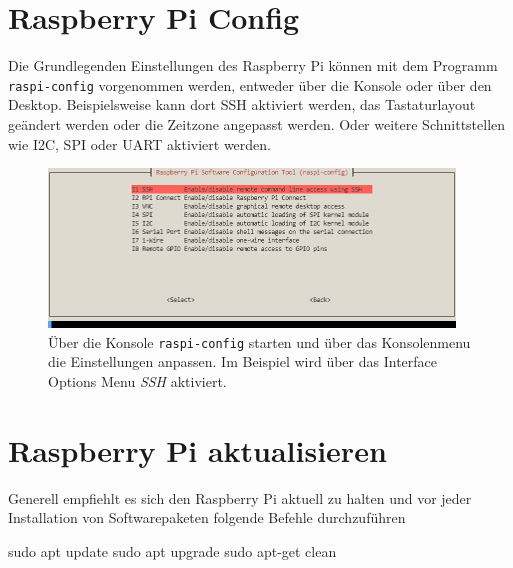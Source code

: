 \documentclass[
  11pt,
  a4paperpaper,
  oneside, openany  ,captions=tableheading
]{scrbook}
\newenvironment{Shaded}{\begin{snugshade}}{\end{snugshade}}
\newcommand{\FunctionTok}[1]{\textcolor[rgb]{0.28,0.35,0.67}{#1}}
\newcommand{\NormalTok}[1]{\textcolor[rgb]{0.00,0.23,0.31}{#1}}
\theoremstyle{definition}
\theoremstyle{remark}
\begin{document}
\section{Raspberry Pi Config}\label{raspberry-pi-config}

Die Grundlegenden Einstellungen des Raspberry Pi können mit dem Programm
\texttt{raspi-config} vorgenommen werden, entweder
über die Konsole oder über den Desktop. Beispielsweise kann dort SSH
aktiviert werden, das Tastaturlayout geändert werden oder die Zeitzone
angepasst werden. Oder weitere Schnittstellen wie I2C, SPI oder UART
aktiviert werden.

\begin{figure}[H]

{\centering \includegraphics{images/raspberry_pi_enable_ssh.png}

}

\caption{Über die Konsole \texttt{raspi-config} starten und über das
Konsolenmenu die Einstellungen anpassen. Im Beispiel wird über das
Interface Options Menu \emph{SSH} aktiviert.}

\end{figure}%

\section{\texorpdfstring{Raspberry Pi
aktualisieren}{Raspberry Pi aktualisieren}}\label{raspberry-pi-aktualisieren}

Generell empfiehlt es sich den Raspberry Pi aktuell zu halten und vor
jeder Installation von Softwarepaketen folgende Befehle durchzuführen

\begin{Shaded}
\begin{Highlighting}[]
\FunctionTok{sudo}\NormalTok{ apt update}
\FunctionTok{sudo}\NormalTok{ apt upgrade}
\FunctionTok{sudo}\NormalTok{ apt{-}get clean}
\end{Highlighting}
\end{Shaded}
\end{document}
